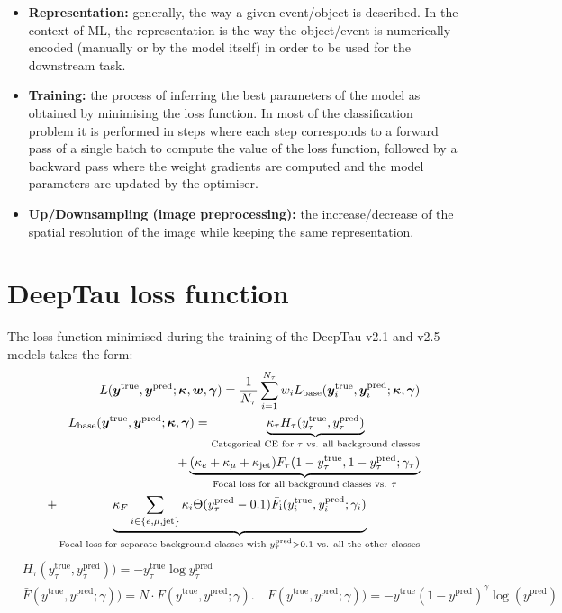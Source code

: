 \begin{itemize}
    \item[] \textbf{Representation:} generally, the way a given event/object is described. In the context of ML, the representation is the way the object/event is numerically encoded (manually or by the model itself) in order to be used for the downstream task.   

    \item[] \textbf{Training:} the process of inferring the best parameters of the model as obtained by minimising the loss function. In most of the classification problem it is performed in steps where each step corresponds to a forward pass of a single batch to compute the value of the loss function, followed by a backward pass where the weight gradients are computed and the model parameters are updated by the optimiser. 

    \item[] \textbf{Up/Downsampling (image preprocessing):} the increase/decrease of the spatial resolution of the image while keeping the same representation. 
\end{itemize}

\section{DeepTau loss function}\label{app:loss}
The loss function minimised during the training of the DeepTau v2.1 and v2.5 models takes the form:
\begin{align*}
    L(\yt, \yp; \boldsymbol{\kappa}, \boldsymbol{w}, \boldsymbol{\gamma}) = \dfrac{1}{N_\tau}\sum_{i=1}^{N_\tau}w_i L_\text{base}(\yt_i, \yp_i; \boldsymbol{\kappa}, \boldsymbol{\gamma})\\
    L_\text{base}(\yt, \yp; \boldsymbol{\kappa}, \boldsymbol{\gamma}) = \underbrace{\kappa_\tau H_\tau(y_\tau^\text{true}, y_\tau^\text{pred})}_{\text{Categorical CE for }\tau \text{ vs. all background classes}}\\
    + \underbrace{(\kappa_e + \kappa_\mu + \kappa_\text{jet})\bar{F}_\tau(1-y_\tau^\text{true}, 1-y_\tau^\text{pred}; \gamma_\tau)}_{\text{Focal loss for all background classes vs. } \tau} \\ %
    + \underbrace{\kappa_F\sum_{i \in \{e, \mu, \text{jet}\}}\kappa_i \Theta(y_\tau^\text{pred} - 0.1)\bar{F}_\text{i}(y_i^\text{true}, y_i^\text{pred}; \gamma_i)}_{\text{Focal loss for separate background classes with } y_\tau^\text{pred} > 0.1 \text{ vs. all the other classes}}\\
\end{align*}
\begin{align*}
    &H_\tau(y_\tau^\text{true}, y_\tau^\text{pred})) = -y_\tau^\text{true} \log y_\tau^\text{pred}\\
    &\bar{F}(y^\text{true}, y^\text{pred}; \gamma)) = N \cdot F(y^\text{true}, y^\text{pred}; \gamma). \quad F(y^\text{true}, y^\text{pred}; \gamma)) = - y^\text{true} (1-y^\text{pred})^\gamma \log(y^\text{pred})\\
\end{align*}

